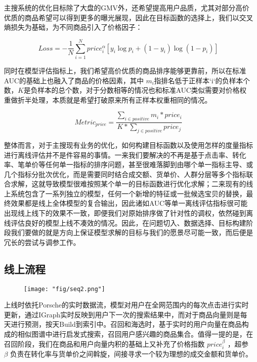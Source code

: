 主搜系统的优化目标除了大盘的GMV外，还希望提高用户品质，尤其对部分高价优质的商品希望可以得到更多的曝光展现，因此在目标函数的选择上，我们以交叉熵损失为基础，为不同商品引入了价格因子： 

$$Loss = - \frac{1}{N} \sum\limits_{i=1}^{N} { price_{i}^{\alpha} \left[ y_i\log{p_i} + (1 - y_i)\log{(1-p_i)} \right] }$$

同时在模型评估指标上，我们希望高价优质的商品排序能够更靠前，所以在标准AUC的基础上也融入了商品的价格因素，其中 $m_{i}$指排名低于正样本`i`的负样本个数，$K$是负样本的总个数，对于分数相等的情况也和标准AUC类似需要对价格权重做折半处理，本质就是希望打破原来所有正样本权重相同的情况。

$$Metric_{price} = \frac{\sum_{i \in positive} {m_{i} * price_{i}}}{K * \sum_{j \in positive} {price_{j}}}$$


\par 整体而言，对于主搜现有业务的优化，如何构建目标函数以及使用怎样的度量指标进行离线评估并不是件容易的事情。一来我们要解决的不再是基于点击率、转化率、笔单价等任何单一指标的排序问题，甚至很难落脚到由哪个单一指标主导、或几个指标分批次优化，而是需要同时结合成交额、货单价、人群分层等多个指标联合求解，这就导致模型很难按照某个单一的目标函数进行优化求解；二来现有的线上系统包含了一系列独立的模型，任何一个新增的特征或一批候选宝贝的替换，最终效果都是线上全体模型的复合输出，因此诸如AUC等单一离线评估指标很可能出现线上线下的效果不一致，即便我们对原始排序做了针对性的调权，依然碰到离线评估良好的模型上线不凑效的情况。因此，在问题切入、数据选择、目标构建阶段我们要做的就是方向上保证模型求解的目标与我们的愿景尽可能一致，而后便是冗长的尝试与调参工作。

\subsection{线上流程}
\begin{figure}[!h]
	\centering
	\texttt{[image: "fig/seq2.png"]}
	\caption{}
	\label{fig:seq2}
\end{figure}

上线时依托Porsche的实时数据流，模型对用户在全网范围内的每次点击进行实时更新，通过IGraph实时反映到用户下一次的搜索结果中，而对于商品向量则是每天进行预测，按天Build到索引中。召回和海选时，基于实时的用户向量在商品构成的相似图谱中进行启发式搜索，召回用户感兴趣的商品集合。值得一提的是，在召回阶段，我们在商品和用户向量内积的基础上又补充了价格指数 $price_{i}^{\beta}$ ，超参 $\beta$ 负责在转化率与货单价之间斡旋，间接寻求一个较为理想的成交金额和货单价。

